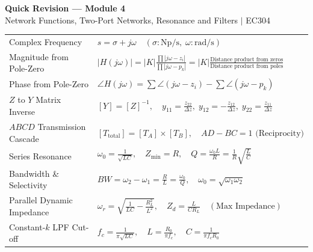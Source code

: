 \documentclass[12pt,a4paper]{article}
\renewcommand{\arraystretch}{1.45}
\begin{document}
\newpage
\begin{center}
  {\large\bfseries\color{myred} Quick Revision --- Module 4}\\[2pt]
  {\small\color{mydark} Network Functions, Two-Port Networks, Resonance and Filters $|$ EC304}
\end{center}
\noindent{\color{myred}\rule{\linewidth}{1.0pt}}
\vspace{2pt}

\begin{tcolorbox}[formulabox, top=5pt, bottom=5pt, title={\textbf{Key Formulas and Network Relations at a Glance}}]
\renewcommand{\arraystretch}{1.20}
\begin{tabularx}{\linewidth}{B{5.0cm} X}
Complex Frequency & $s = \sigma + j\omega \quad (\sigma: \text{Np/s}, \; \omega: \text{rad/s})$ \\[2pt]
Magnitude from Pole-Zero & $|H(j\omega)| = |K| \frac{\prod |j\omega - z_i|}{\prod |j\omega - p_k|} = |K| \frac{\text{Distance product from zeros}}{\text{Distance product from poles}}$ \\[2pt]
Phase from Pole-Zero & $\angle H(j\omega) = \sum \angle(j\omega - z_i) - \sum \angle(j\omega - p_k)$ \\[2pt]
$Z$ to $Y$ Matrix Inverse & $[Y] = [Z]^{-1}, \quad y_{11} = \frac{z_{22}}{\Delta z}, \; y_{12} = -\frac{z_{12}}{\Delta z}, \; y_{22} = \frac{z_{11}}{\Delta z}$ \\[2pt]
$ABCD$ Transmission Cascade & $[T_{\text{total}}] = [T_A] \times [T_B], \quad AD - BC = 1 \text{ (Reciprocity)}$ \\[2pt]
Series Resonance & $\omega_0 = \frac{1}{\sqrt{LC}}, \quad Z_{\min} = R, \quad Q = \frac{\omega_0 L}{R} = \frac{1}{R}\sqrt{\frac{L}{C}}$ \\[2pt]
Bandwidth \& Selectivity & $BW = \omega_2 - \omega_1 = \frac{R}{L} = \frac{\omega_0}{Q}, \quad \omega_0 = \sqrt{\omega_1 \omega_2}$ \\[2pt]
Parallel Dynamic Impedance & $\omega_r = \sqrt{\frac{1}{LC} - \frac{R_L^2}{L^2}}, \quad Z_d = \frac{L}{C R_L} \quad (\text{Max Impedance})$ \\[2pt]
Constant-$k$ LPF Cut-off & $f_c = \frac{1}{\pi\sqrt{LC}}, \quad L = \frac{R_0}{\pi f_c}, \quad C = \frac{1}{\pi f_c R_0}$ \\[2pt]
\end{tabularx}
\end{tcolorbox}
\end{document}
